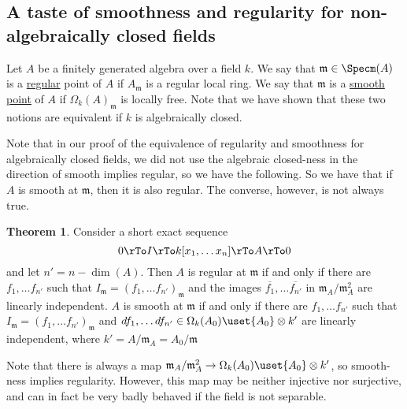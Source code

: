 \documentclass[12 pt]{article}
\theoremstyle{definition}
\newtheorem{theorem}{Theorem}[section]
\begin{document}
\subsection{A taste of smoothness and regularity for non-algebraically closed fields}

\begin{definition} Let $A$ be a finitely generated algebra over a field $k$. We say that $\mathfrak{m} \in \Specm(A)$ is a \uline{regular} point of $A$ if $A_\mathfrak{m}$ is a regular local ring. We say that $\mathfrak{m}$ is a \uline{smooth point} of $A$ if $\Omega_k(A)_\mathfrak{m}$ is locally free. Note that we have shown that these two notions are equivalent if $k$ is algebraically closed.
\end{definition}

Note that in our proof of the equivalence of regularity and smoothness for algebraically closed fields, we did not use the algebraic closed-ness in the direction of smooth implies regular, so we have the following. So we have that if $A$ is smooth at $\mathfrak{m}$, then it is also regular. The converse, however, is not always true.



\begin{theorem} Consider a short exact sequence
\[0 \rTo I \rTo k[x_1, \ldots x_n] \rTo A \rTo 0\]
and let $n'=n-\dim(A)$.
Then $A$ is regular at $\mathfrak{m}$ if and only if there are $f_1, \ldots f_{n'}$ such that $I_\mathfrak{m}=(f_1, \ldots f_{n'})_\mathfrak{m}$ and the images $\overline{f_1}, \ldots \overline{f_{n'}}$ in $\mathfrak{m}_{A}/\mathfrak{m}_{A}^2$ are linearly independent. $A$ is smooth at $\mathfrak{m}$ if and only if there are $f_1, \ldots f_{n'}$ such that $I_{\mathfrak{m}}=(f_1, \ldots f_{n'})_\mathfrak{m}$ and $df_1, \ldots df_{n'} \in \Omega_k(A_0) \uset{A_0} \otimes k'$ are linearly independent, where $k'=A/\mathfrak{m}_A=A_0/\mathfrak{m}$
\end{theorem}

Note that there is always a map $\mathfrak{m}_A/\mathfrak{m}_A^2 \to \Omega_k(A_0) \uset{A_0}\otimes k'$, so smooth-ness implies regularity. However, this map may be neither injective nor surjective, and can in fact be very badly behaved if the field is not separable.
\end{document}
